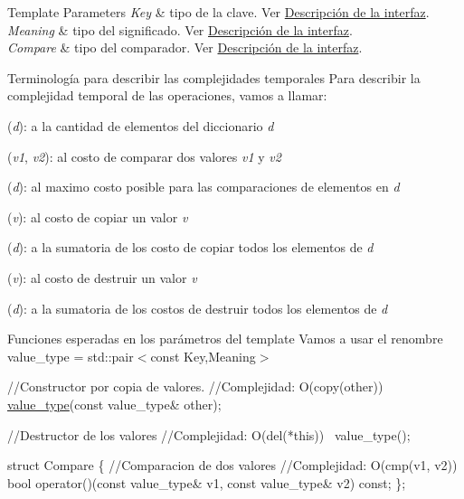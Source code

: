 \begin{DoxyTemplParams}{Template Parameters}
{\em Key} & tipo de la clave. Ver \hyperlink{Interfaz}{Descripción de la interfaz}. \\
\hline
{\em Meaning} & tipo del significado. Ver \hyperlink{Interfaz}{Descripción de la interfaz}. \\
\hline
{\em Compare} & tipo del comparador. Ver \hyperlink{Interfaz}{Descripción de la interfaz}.\\
\hline
\end{DoxyTemplParams}
\begin{DoxyParagraph}{Terminología para describir las complejidades temporales}
Para describir la complejidad temporal de las operaciones, vamos a llamar\+:
\begin{DoxyItemize}
\item ({\itshape d})\+: a la cantidad de elementos del diccionario {\itshape d} 
\item ({\itshape v1}, {\itshape v2})\+: al costo de comparar dos valores {\itshape v1} y {\itshape v2} 
\item ({\itshape d})\+: al maximo costo posible para las comparaciones de elementos en {\itshape d} 
\item ({\itshape v})\+: al costo de copiar un valor {\itshape v} 
\item ({\itshape d})\+: a la sumatoria de los costo de copiar todos los elementos de {\itshape d} 
\item ({\itshape v})\+: al costo de destruir un valor {\itshape v} 
\item ({\itshape d})\+: a la sumatoria de los costos de destruir todos los elementos de {\itshape d} 
\end{DoxyItemize}
\end{DoxyParagraph}


\begin{DoxyParagraph}{Funciones esperadas en los parámetros del template}
Vamos a usar el renombre value\+\_\+type = std\+::pair$<$const Key,\+Meaning$>$


\begin{DoxyCode}
\textcolor{comment}{//Constructor por copia de valores.}
\textcolor{comment}{//Complejidad: O(copy(other))}
\hyperlink{classaed2_1_1map_a719db98e0ff9a837610f76be33264680}{value\_type}(\textcolor{keyword}{const} value\_type& other);

\textcolor{comment}{//Destructor de los valores}
\textcolor{comment}{//Complejidad: O(del(*this))}
~value\_type();

\textcolor{keyword}{struct }Compare \{
  \textcolor{comment}{//Comparacion de dos valores}
  \textcolor{comment}{//Complejidad: O(cmp(v1, v2))}
  \textcolor{keywordtype}{bool} operator()(\textcolor{keyword}{const} value\_type& v1, \textcolor{keyword}{const} value\_type& v2) \textcolor{keyword}{const};
\};
\end{DoxyCode}
 
\end{DoxyParagraph}


